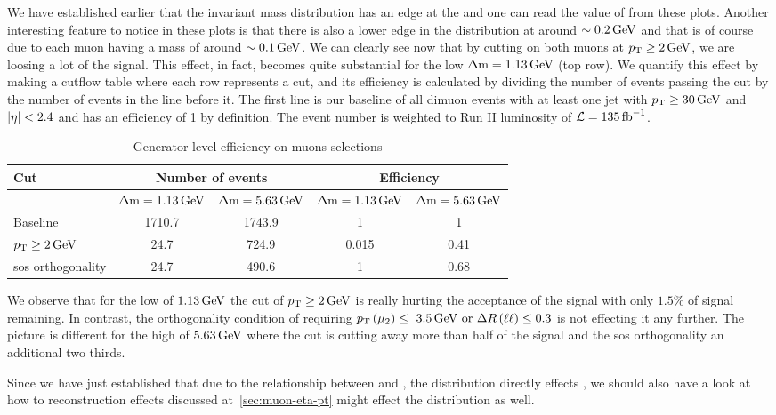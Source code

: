 We have established earlier that the invariant mass distribution has an edge at the \dm and one can read the value of \dm from these plots. Another interesting feature to notice in these plots is that there is also a lower edge in the \dm distribution at around $\sim 0.2\,\text{Ge\hspace{-.08em}V}$ and that is of course due to each muon having a mass of around $\sim 0.1\,\text{Ge\hspace{-.08em}V}$. We can clearly see now that by cutting on both muons at $p_{\mathrm{T}}\geq 2\,\text{Ge\hspace{-.08em}V}$, we are loosing a lot of the signal. This effect, in fact, becomes quite substantial for the low $\Delta\mathrm{m}=1.13\,\text{Ge\hspace{-.08em}V}$ (top row). We quantify this effect by making a cutflow table where each row represents a cut, and its efficiency is calculated by dividing the number of events passing the cut by the number of events in the line before it. The first line is our baseline of all dimuon events with at least one jet with $p_{\mathrm{T}} \geq 30\,\text{Ge\hspace{-.08em}V}$ and $\lvert \eta \rvert<2.4$ and has an efficiency of 1 by definition. The event number is weighted to Run II luminosity of $\mathcal{L} = 135 \mbox{\ensuremath{\,\text{fb}^{-1}}}$.

\begin{table}[!htb]
	\centering
	\label{tab:gen-muon-pt-dr-efficiency}
		\caption{Generator level efficiency on muons selections}
			\begin{tabular}{l|cc|cc} \hline
			Cut & \multicolumn{2}{c|}{Number of events} & \multicolumn{2}{c}{Efficiency} \\ \hline
			
			 & $\Delta\mathrm{m}=1.13\,\text{Ge\hspace{-.08em}V}$ & $\Delta\mathrm{m}=5.63\,\text{Ge\hspace{-.08em}V}$ & $\Delta\mathrm{m}=1.13\,\text{Ge\hspace{-.08em}V}$ & $\Delta\mathrm{m}=5.63\,\text{Ge\hspace{-.08em}V}$ \\
			Baseline & 1710.7 & 1743.9 & 1 & 1\\
			$p_{\mathrm{T}}\geq 2\,\text{Ge\hspace{-.08em}V}$ & 24.7 & 724.9 & 0.015 & 0.41\\
			\gls{sos} orthogonality & 24.7 & 490.6 & 1 & 0.68 \\ \hline
			\end{tabular}
\end{table}

We observe that for the low \dm of $1.13\,\text{Ge\hspace{-.08em}V}$ the cut of $p_{\mathrm{T}}\geq 2\,\text{Ge\hspace{-.08em}V}$ is really hurting the acceptance of the signal with only $1.5\%$ of signal remaining. In contrast, the orthogonality condition of requiring $p_{\mathrm{T}}\left(\mu_2\right)\leq~3.5\,\text{Ge\hspace{-.08em}V}\text{ or }\Delta R\left(\ell\ell\right)\leq 0.3$ is not effecting it any further. The picture is different for the high \dm of $5.63\,\text{Ge\hspace{-.08em}V}$ where the \pt cut is cutting away more than half of the signal and the \gls{sos} orthogonality an additional two thirds.

Since we have just established that due to the relationship between \pt and \mll, the \pt distribution directly effects \mll, we should also have a look at how to reconstruction effects discussed at~\ref{sec:muon-eta-pt} might effect the \mmumu distribution as well.


